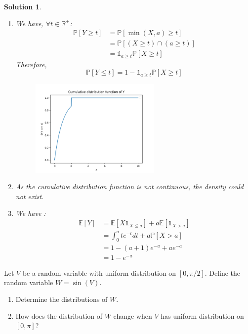 \documentclass{article}
\newcommand{\proba}[1]{\mathbb{P}[#1]}
\newcommand{\esperance}[1]{\mathbb{E}[#1]}
\newcommand{\indicator}[1]{\mathbb{1}_{#1}}
\newcommand{\R}{\mathbb{R}}
\newtheorem{solution}{Solution}
\begin{document}
\begin{solution}
  \begin{enumerate}
    \item We have, $\forall t \in \R^+$:
          \begin{align*}
            \proba{Y \geq t} & = \proba{\min(X, a) \geq t}             \\
                             & = \proba{(X \geq t) \cap (a \geq t)}    \\
                             & = \indicator{a \geq t} \proba{X \geq t}
          \end{align*}
          Therefore,
          \[
            \proba{Y \leq t} = 1 - \indicator{a \geq t} \proba{X \geq t}
          \]
          \begin{figure}
            \centering
            \includegraphics[width=0.6\textwidth]{cdf.png}
          \end{figure}
    \item As the cumulative distribution function is not continuous, the density could
          not exist.
    \item We have :
          \begin{align*}
            \esperance{Y} & = \esperance{X \mathbb{1}_{X \leq a} } + a \esperance{\mathbb{1}_{X>a}} \\
                          & = \int_0^a t e^{-t} dt + a \proba{X > a}                                \\
                          & = 1 - (a+1) e^{-a} + a e^{-a}                                           \\
                          & = 1 - e^{-a}
          \end{align*}
  \end{enumerate}
\end{solution}

\begin{Exercise} Let $V$ be a random variable with uniform distribution on $[0, \pi / 2]$. Define the random variable $W=\sin (V)$.
  \begin{enumerate}
    \item Determine the distributions of $W$.
    \item How does the distribution of $W$ change when $V$ has uniform distribution on
          $[0, \pi]$?
  \end{enumerate}
\end{Exercise}
\end{document}
